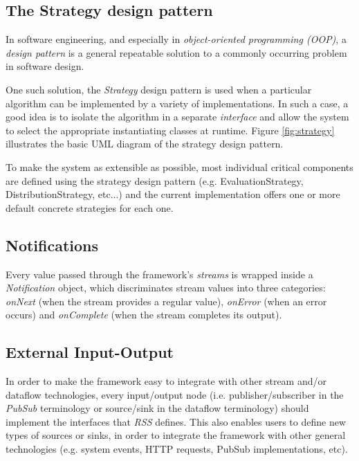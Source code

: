 \documentclass[sigplan,review,anonymous]{acmart}
\begin{document}
\subsection{The Strategy design pattern}

In software engineering, and especially in \textit{object-oriented programming
(OOP)}, a \textit{design pattern} is a general repeatable solution to a commonly
occurring problem in software design\cite{design}.

One such solution, the \textit{Strategy} design pattern is used when a
particular algorithm can be implemented by a variety of implementations. In such
a case, a good idea is to isolate the algorithm in a separate \textit{interface}
and allow the system to select the appropriate instantiating classes at runtime.
Figure \ref{fig:strategy} illustrates the basic UML diagram of the strategy
design pattern.

To make the system as extensible as possible, most individual critical
components are defined using the strategy design pattern (e.g.
EvaluationStrategy, DistributionStrategy, etc...) and the current implementation
offers one or more default concrete strategies for each one.


\subsection{Notifications}

Every value passed through the framework's
\textit{streams} is wrapped inside a \textit{Notification} object, which
discriminates stream values into three categories: \textit{onNext} (when the
stream provides a regular value), \textit{onError} (when an error occurs) and
\textit{onComplete} (when the stream completes its output).

\subsection{External Input-Output} \label{external}

In order to make the framework easy to integrate with other stream and/or
dataflow technologies, every input/output node (i.e. publisher/subscriber in
the \textit{PubSub}
terminology or source/sink in the dataflow terminology) should implement the
interfaces that \textit{RSS} defines. This also enables users to define new
types of sources or sinks, in order to integrate the framework with other
general technologies (e.g. system events, HTTP requests, PubSub implementations,
etc).
\end{document}
